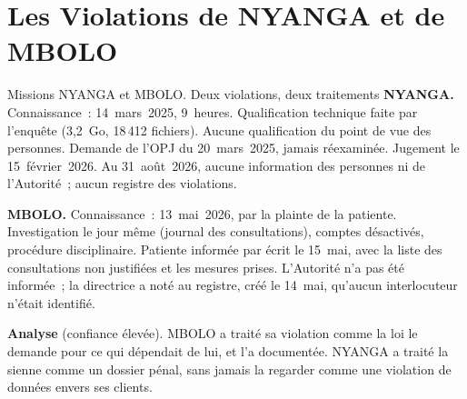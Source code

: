 \section{Les Violations de NYANGA et de MBOLO}
\label{sec:c12-cas}

\begin{boxscenario}{Missions NYANGA et MBOLO. Deux violations, deux traitements}
\textbf{NYANGA.} Connaissance~: 14~mars~2025, 9~heures. Qualification
technique faite par l'enquête (3,2~Go, 18\,412 fichiers). Aucune
qualification du point de vue des personnes. Demande de l'OPJ du
20~mars~2025, jamais réexaminée. Jugement le 15~février~2026. Au
31~août~2026, aucune information des personnes ni de l'Autorité~; aucun
registre des violations.

\textbf{MBOLO.} Connaissance~: 13~mai~2026, par la plainte de la patiente.
Investigation le jour même (journal des consultations), comptes désactivés,
procédure disciplinaire. Patiente informée par écrit le 15~mai, avec la
liste des consultations non justifiées et les mesures prises. L'Autorité
n'a pas été informée~; la directrice a noté au registre, créé le 14~mai,
qu'aucun interlocuteur n'était identifié.

\textbf{Analyse} (confiance élevée). MBOLO a traité sa violation comme la
loi le demande pour ce qui dépendait de lui, et l'a documentée. NYANGA a
traité la sienne comme un dossier pénal, sans jamais la regarder comme une
violation de données envers ses clients.
\end{boxscenario}

